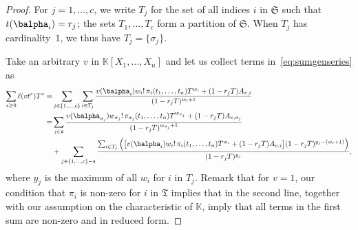 \documentclass[12pt]{article}
\def\K {\ensuremath{\mathbb{K}}}
\def\K{\mathbb{K}}
\begin{document}
\begin{proof}
	For $j=1,\dots,c$, we write $T_j$ for the set of all indices $i$ in
	$\mathfrak{S}$ such that $t(\balpha_{i})=r_j$; the sets
	$T_1,\dots,T_c$ form a partition of $\mathfrak{S}$. When $T_j$ has
	cardinality~$1$, we thus have $T_j=\{\sigma_j\}$.
	
	Take an arbitrary $v$ in $\K[X_1,\dots,X_n]$ and let us
	collect terms in~\eqref{eq:sumgenseries} as
	\begin{align*}
	\sum_{s \ge 0} \ell(v t^s)T^s =&
	\sum_{j \in \{1,\dots,c\}}
	\sum_{i \in T_j} \frac{
		v(\balpha_{i})   w_{i}!\, \pi_{i}(t_1,\dots,t_n)
		T^{w_{i}} + (1-r_{j}  T)A_{v,i}}
	{(1-r_{j} T)^{w_{i}+1}}\\
	=&
	\sum_{j \in \mathfrak{s}}
	\frac{
		v(\balpha_{\sigma_{j}})  w_{\sigma_j}!\, \pi_{\sigma_j}(t_1,\dots,t_n)
		T^{w_{\sigma_j}} + (1-r_{j}  T)A_{v,\sigma_j} }
	{(1-r_{j} T)^{w_{\sigma_j}+1}}\\
	&+
	\sum_{j \in \{1,\dots,c\}-\mathfrak{s}}
	\frac{   \sum_{i \in T_j} \Big( \big[
		v(\balpha_{i})   w_{i}!\, \pi_{i}(t_1,\dots,t_n)
		T^{w_{i}} + (1-r_{j}  T)A_{v,i} \big ]
		(1-r_{j} T)^{y_j-(w_i+1)}\Big)}
	{(1-r_{j} T)^{y_j}},
	\end{align*}
	where $y_j$ is the maximum of all $w_i$ for $i$ in $T_j$.  Remark that
	for $v=1$, our condition that $\pi_i$ is non-zero for $i$ in
	$\mathfrak{T}$ implies that in the second line, together with our
	assumption on the characteristic of $\K$, imply that all terms in the
	first sum are non-zero and in reduced form.  
	

\end{proof}
\end{document}
